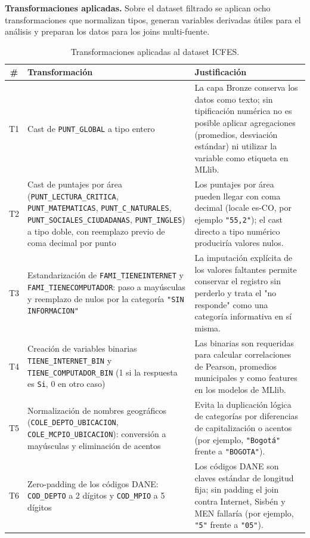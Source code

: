 \textbf{Transformaciones aplicadas.} Sobre el dataset filtrado se aplican ocho transformaciones que normalizan tipos, generan variables derivadas útiles para el análisis y preparan los datos para los joins multi-fuente.

\begin{table}[H]
\centering
\caption{Transformaciones aplicadas al dataset ICFES.}
\begin{tabularx}{\textwidth}{c l X}
\toprule
\textbf{\#} & \textbf{Transformación} & \textbf{Justificación} \\
\midrule
T1 & Cast de \texttt{PUNT\_GLOBAL} a tipo entero & La capa Bronze conserva los datos como texto; sin tipificación numérica no es posible aplicar agregaciones (promedios, desviación estándar) ni utilizar la variable como etiqueta en MLlib. \\
T2 & Cast de puntajes por área (\texttt{PUNT\_LECTURA\_CRITICA}, \texttt{PUNT\_MATEMATICAS}, \texttt{PUNT\_C\_NATURALES}, \texttt{PUNT\_SOCIALES\_CIUDADANAS}, \texttt{PUNT\_INGLES}) a tipo doble, con reemplazo previo de coma decimal por punto & Los puntajes por área pueden llegar con coma decimal (locale es-CO, por ejemplo \texttt{"55,2"}); el cast directo a tipo numérico produciría valores nulos. \\
T3 & Estandarización de \texttt{FAMI\_TIENEINTERNET} y \texttt{FAMI\_TIENECOMPUTADOR}: paso a mayúsculas y reemplazo de nulos por la categoría \texttt{"SIN INFORMACION"} & La imputación explícita de los valores faltantes permite conservar el registro sin perderlo y trata el "no responde" como una categoría informativa en sí misma. \\
T4 & Creación de variables binarias \texttt{TIENE\_INTERNET\_BIN} y \texttt{TIENE\_COMPUTADOR\_BIN} (1 si la respuesta es \texttt{Si}, 0 en otro caso) & Las binarias son requeridas para calcular correlaciones de Pearson, promedios municipales y como features en los modelos de MLlib. \\
T5 & Normalización de nombres geográficos (\texttt{COLE\_DEPTO\_UBICACION}, \texttt{COLE\_MCPIO\_UBICACION}): conversión a mayúsculas y eliminación de acentos & Evita la duplicación lógica de categorías por diferencias de capitalización o acentos (por ejemplo, \texttt{"Bogotá"} frente a \texttt{"BOGOTA"}). \\
T6 & Zero-padding de los códigos DANE: \texttt{COD\_DEPTO} a 2 dígitos y \texttt{COD\_MPIO} a 5 dígitos & Los códigos DANE son claves estándar de longitud fija; sin padding el join contra Internet, Sisbén y MEN fallaría (por ejemplo, \texttt{"5"} frente a \texttt{"05"}). \\

\end{tabularx}
\end{table}
